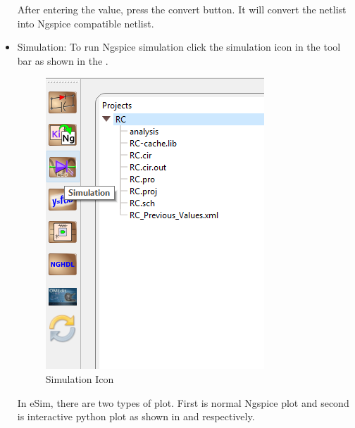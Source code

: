 \begin{itemize}
After entering the value, press the convert button. It will convert the netlist into Ngspice compatible netlist.

\pagebreak

\item Simulation:
To run Ngspice simulation click the simulation icon in the tool bar as shown in the .
\begin{figure}[!htp]
\centering
\includegraphics[width=\tnfig]{figures/rc_plot.png}
\caption{Simulation Icon}
\label{rcplot}
\end{figure}

In eSim, there are two types of plot. First is normal Ngspice plot and second is interactive python plot as shown in  and  respectively.


\end{itemize}
